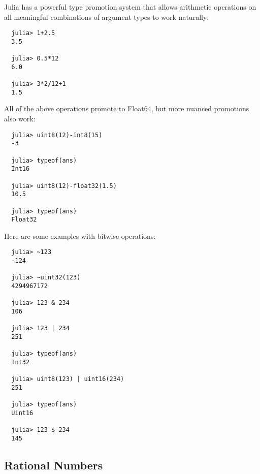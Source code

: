 \documentclass{article}
\begin{document}
Julia has a powerful type promotion system that allows arithmetic operations on all meaningful combinations of argument types to work naturally:
\begin{verbatim}
  julia> 1+2.5
  3.5

  julia> 0.5*12
  6.0

  julia> 3*2/12+1
  1.5
\end{verbatim}
All of the above operations promote to Float64, but more nuanced promotions also work:
\begin{verbatim}
  julia> uint8(12)-int8(15)
  -3

  julia> typeof(ans)
  Int16

  julia> uint8(12)-float32(1.5)
  10.5

  julia> typeof(ans)
  Float32
\end{verbatim}
Here are some examples with bitwise operations:
\begin{verbatim}
  julia> ~123
  -124

  julia> ~uint32(123)
  4294967172

  julia> 123 & 234
  106

  julia> 123 | 234
  251

  julia> typeof(ans)
  Int32

  julia> uint8(123) | uint16(234)
  251

  julia> typeof(ans)
  Uint16

  julia> 123 $ 234
  145
\end{verbatim}

\subsection{Rational Numbers}
\end{document}

